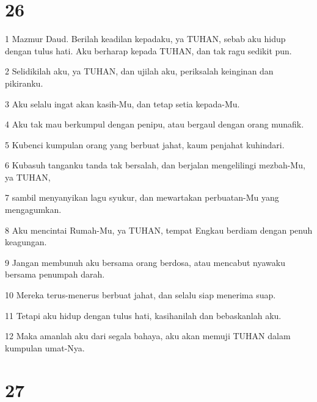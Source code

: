 \chapter{26}

\par 1 Mazmur Daud. Berilah keadilan kepadaku, ya TUHAN, sebab aku hidup dengan tulus hati. Aku berharap kepada TUHAN, dan tak ragu sedikit pun.
\par 2 Selidikilah aku, ya TUHAN, dan ujilah aku, periksalah keinginan dan pikiranku.
\par 3 Aku selalu ingat akan kasih-Mu, dan tetap setia kepada-Mu.
\par 4 Aku tak mau berkumpul dengan penipu, atau bergaul dengan orang munafik.
\par 5 Kubenci kumpulan orang yang berbuat jahat, kaum penjahat kuhindari.
\par 6 Kubasuh tanganku tanda tak bersalah, dan berjalan mengelilingi mezbah-Mu, ya TUHAN,
\par 7 sambil menyanyikan lagu syukur, dan mewartakan perbuatan-Mu yang mengagumkan.
\par 8 Aku mencintai Rumah-Mu, ya TUHAN, tempat Engkau berdiam dengan penuh keagungan.
\par 9 Jangan membunuh aku bersama orang berdosa, atau mencabut nyawaku bersama penumpah darah.
\par 10 Mereka terus-menerus berbuat jahat, dan selalu siap menerima suap.
\par 11 Tetapi aku hidup dengan tulus hati, kasihanilah dan bebaskanlah aku.
\par 12 Maka amanlah aku dari segala bahaya, aku akan memuji TUHAN dalam kumpulan umat-Nya.

\chapter{27}

